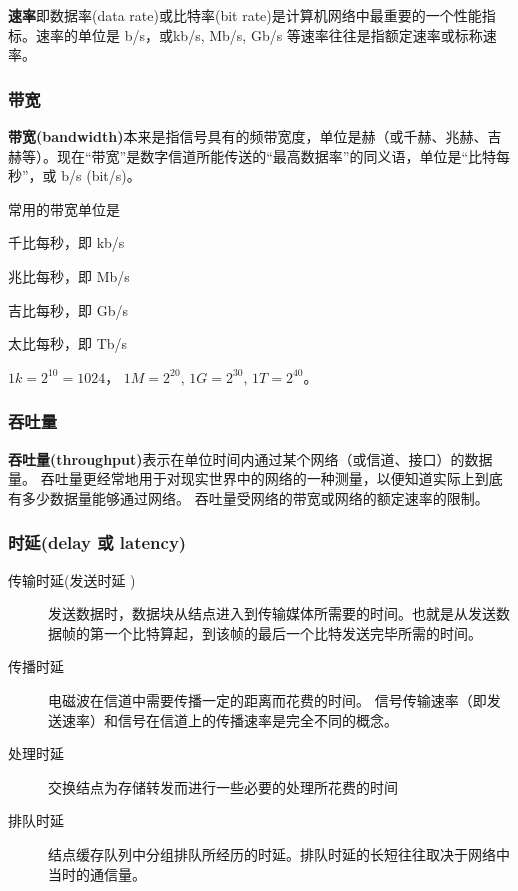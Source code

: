 \textbf{速率}即数据率(data rate)或比特率(bit rate)是计算机网络中最重要的一个性能指标。速率的单位是 b/s，或kb/s, Mb/s, Gb/s 等速率往往是指额定速率或标称速率。

\subsubsection{带宽}
\textbf{带宽(bandwidth)}本来是指信号具有的频带宽度，单位是赫（或千赫、兆赫、吉赫等）。现在“带宽”是数字信道所能传送的“最高数据率”的同义语，单位是“比特每秒”，或 b/s (bit/s)。

\begin{remark}
常用的带宽单位是

千比每秒，即 kb/s

兆比每秒，即 Mb/s

吉比每秒，即 Gb/s

太比每秒，即 Tb/s

$1k = 2^{10} = 1024$， $1M = 2^{20}$, $1G = 2^{30}$, $1T = 2^{40}$。
\end{remark}


\subsubsection{吞吐量}
\textbf{吞吐量(throughput)}表示在单位时间内通过某个网络（或信道、接口）的数据量。
吞吐量更经常地用于对现实世界中的网络的一种测量，以便知道实际上到底有多少数据量能够通过网络。
吞吐量受网络的带宽或网络的额定速率的限制。

\subsubsection{时延(delay 或 latency)}


\begin{description}
  \item[传输时延(发送时延 )] 发送数据时，数据块从结点进入到传输媒体所需要的时间。也就是从发送数据帧的第一个比特算起，到该帧的最后一个比特发送完毕所需的时间。
  \item[传播时延] 电磁波在信道中需要传播一定的距离而花费的时间。 信号传输速率（即发送速率）和信号在信道上的传播速率是完全不同的概念。
  \item[处理时延] 交换结点为存储转发而进行一些必要的处理所花费的时间
  \item[排队时延] 结点缓存队列中分组排队所经历的时延。排队时延的长短往往取决于网络中当时的通信量。

\end{description}

